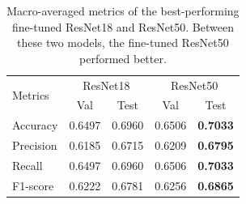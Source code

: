 \begin{table}[h!]
    \begin{tabular}{lcccc}
    \toprule
\multirow{2}{*}{Metrics} & \multicolumn{2}{c}{ResNet18} & \multicolumn{2}{c}{ResNet50} \\ \cmidrule(lr){2-3} \cmidrule(lr){4-5}
                         & Val           & Test          & Val           & Test         \\ \hline
Accuracy                 & 0.6497        & 0.6960        & 0.6506        & \textbf{0.7033}       \\
Precision                & 0.6185        & 0.6715        & 0.6209        & \textbf{0.6795}       \\
Recall                   & 0.6497        & 0.6960        & 0.6506        & \textbf{0.7033}       \\
F1-score                 & 0.6222        & 0.6781        & 0.6256        & \textbf{0.6865}       \\ \bottomrule
    \end{tabular}
    \vspace{\baselineskip}
    \caption{Macro-averaged metrics of the best-performing fine-tuned ResNet18 and ResNet50. Between these two models, the fine-tuned ResNet50 performed better.}
    \label{fig:resnet_compare}
    \vspace{-5mm}
\end{table}

